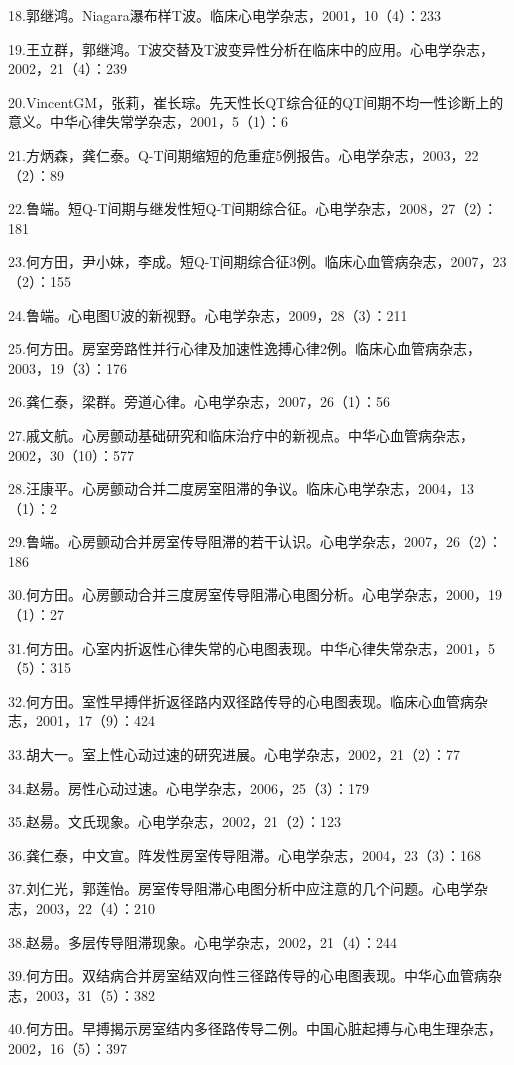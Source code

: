 \documentclass[
  12pt,
  twoside,
  banjiao]{ctexbook}
\begin{document}
18.郭继鸿。Niagara瀑布样T波。临床心电学杂志，2001，10（4）：233

19.王立群，郭继鸿。T波交替及T波变异性分析在临床中的应用。心电学杂志，2002，21（4）：239

20.VincentGM，张莉，崔长琮。先天性长QT综合征的QT间期不均一性诊断上的意义。中华心律失常学杂志，2001，5（1）：6

21.方炳森，龚仁泰。Q-T间期缩短的危重症5例报告。心电学杂志，2003，22（2）：89

22.鲁端。短Q-T间期与继发性短Q-T间期综合征。心电学杂志，2008，27（2）：181

23.何方田，尹小妹，李成。短Q-T间期综合征3例。临床心血管病杂志，2007，23（2）：155

24.鲁端。心电图U波的新视野。心电学杂志，2009，28（3）：211

25.何方田。房室旁路性并行心律及加速性逸搏心律2例。临床心血管病杂志，2003，19（3）：176

26.龚仁泰，梁群。旁道心律。心电学杂志，2007，26（1）：56

27.戚文航。心房颤动基础研究和临床治疗中的新视点。中华心血管病杂志，2002，30（10）：577

28.汪康平。心房颤动合并二度房室阻滞的争议。临床心电学杂志，2004，13（1）：2

29.鲁端。心房颤动合并房室传导阻滞的若干认识。心电学杂志，2007，26（2）：186

30.何方田。心房颤动合并三度房室传导阻滞心电图分析。心电学杂志，2000，19（1）：27

31.何方田。心室内折返性心律失常的心电图表现。中华心律失常杂志，2001，5（5）：315

32.何方田。室性早搏伴折返径路内双径路传导的心电图表现。临床心血管病杂志，2001，17（9）：424

33.胡大一。室上性心动过速的研究进展。心电学杂志，2002，21（2）：77

34.赵昜。房性心动过速。心电学杂志，2006，25（3）：179

35.赵昜。文氏现象。心电学杂志，2002，21（2）：123

36.龚仁泰，中文宣。阵发性房室传导阻滞。心电学杂志，2004，23（3）：168

37.刘仁光，郭莲怡。房室传导阻滞心电图分析中应注意的几个问题。心电学杂志，2003，22（4）：210

38.赵昜。多层传导阻滞现象。心电学杂志，2002，21（4）：244

39.何方田。双结病合并房室结双向性三径路传导的心电图表现。中华心血管病杂志，2003，31（5）：382

40.何方田。早搏揭示房室结内多径路传导二例。中国心脏起搏与心电生理杂志，2002，16（5）：397
\end{document}
